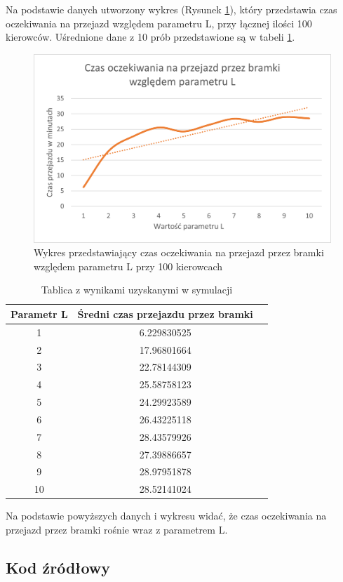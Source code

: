 \documentclass[a4paper,11pt,titlepage]{article}
\begin{document}
Na podstawie danych utworzony wykres (Rysunek \ref{fig:wykres}), który przedstawia czas oczekiwania na przejazd względem parametru L, przy łącznej ilości 100 kierowców. Uśrednione dane z 10 prób przedstawione są w tabeli \ref{tab:res}.

\begin{figure}[H]
 \centering
 \includegraphics[width=1\columnwidth]{img/wykres3.PNG}
 \caption{Wykres przedstawiający czas oczekiwania na przejazd przez bramki względem parametru L przy 100 kierowcach}
 \label{fig:wykres}
\end{figure}

 \begin{table}[h!]
 \centering
 \begin{tabular}{ |c|c|c| } 
 \hline
 Parametr L & Średni czas przejazdu przez bramki \\
 \hline
1 &	6.229830525 \\
2 &	17.96801664 \\
3 &	22.78144309 \\
4 &	25.58758123 \\
5 &	24.29923589 \\
6 &	26.43225118 \\
7 &	28.43579926 \\
8 &	27.39886657 \\
9 &	28.97951878 \\
10 &	28.52141024 \\

 \hline
\end{tabular}
\caption{Tablica z wynikami uzyskanymi w symulacji}
\label{tab:res}
 \end{table}

Na podstawie powyższych danych i wykresu widać, że czas oczekiwania na przejazd przez bramki rośnie wraz z parametrem L.

\subsection{Kod źródłowy}




\end{document}
